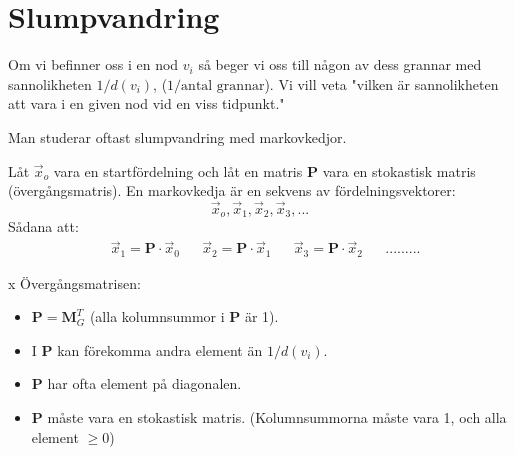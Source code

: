 \section{Slumpvandring} %
\label{sec:slumpvandring}
\begin{Def}
	Om vi befinner oss i en nod $v_i$ så beger vi oss till någon av dess grannar med sannolikheten $1/d(v_i)$, ($1/\mbox{antal grannar}$). Vi vill veta "vilken är sannolikheten att vara i en given nod vid en viss tidpunkt."
\end{Def}
Man studerar oftast slumpvandring med markovkedjor. 
\begin{Def}
	Låt $\vec{x}_o$ vara en startfördelning och låt en matris \textbf{P} vara en stokastisk matris (övergångsmatris). En markovkedja är en sekvens av fördelningsvektorer:
	\[
	\vec{x}_o, \vec{x}_1, \vec{x}_2, \vec{x}_3, ...
	\]
	Sådana att:
	\begin{align*}
	&\vec{x}_1 = \mathbf{P} \cdot \vec{x}_0
	&& \vec{x}_2 = \mathbf{P} \cdot \vec{x}_1
	&& \vec{x}_3 = \mathbf{P} \cdot \vec{x}_2
	&&.........
	\end{align*}
\end{Def}
\newpage	x
\noindent
Övergångsmatrisen:
\begin{itemize}
	\item $\mathbf{P} = \mathbf{M}_G^T$ (alla kolumnsummor i \textbf{P} är 1). 
	\item I \textbf{P} kan förekomma andra element än $1/d(v_i)$.
	\item \textbf{P} har ofta element på diagonalen.
	\item \textbf{P} måste vara en stokastisk matris. (Kolumnsummorna måste vara 1, och alla element $\ge 0$)
\end{itemize}
